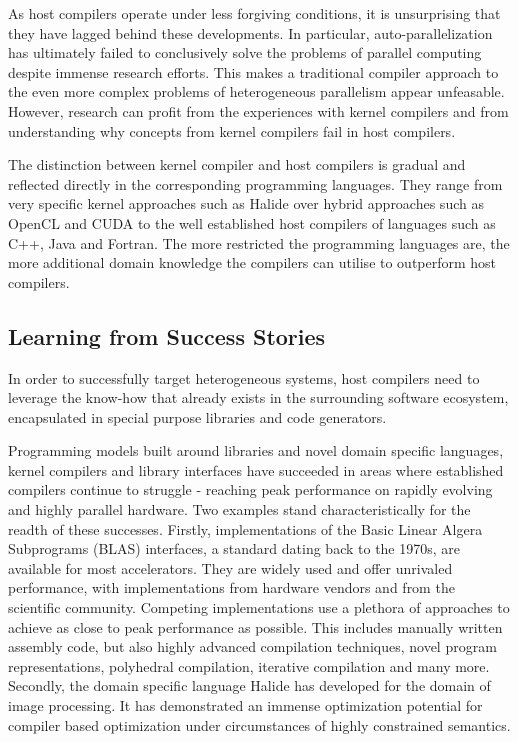     As host compilers operate under less forgiving conditions, it is
    unsurprising that they have lagged behind these developments.
    In particular, auto-parallelization has ultimately failed to conclusively
    solve the problems of parallel computing despite immense research efforts.
    This makes a traditional compiler approach to the even more complex
    problems of heterogeneous parallelism appear unfeasable.
    However, research can profit from the experiences with kernel compilers
    and from understanding why concepts from kernel compilers fail in
    host compilers.

    The distinction between kernel compiler and host compilers is gradual and
    reflected directly in the corresponding programming languages.
    They range from very specific kernel approaches such as Halide over hybrid
    approaches such as OpenCL and CUDA to the well established host compilers of
    languages such as C++, Java and Fortran.
    The more restricted the programming languages are, the more additional
    domain knowledge the compilers can utilise to outperform host compilers.


    \subsection*{Learning from Success Stories}

    In order to successfully target heterogeneous systems, host compilers need
    to leverage the know-how that already exists in the surrounding software
    ecosystem, encapsulated in special purpose libraries and code generators.

    Programming models built around libraries and novel domain specific
    languages, kernel compilers and library interfaces have succeeded in areas
    where established compilers continue to struggle - reaching peak performance
    on rapidly evolving and highly parallel hardware.
    Two examples stand characteristically for the readth of these successes.
    Firstly, implementations of the Basic Linear Algera Subprograms (BLAS)
    interfaces, a standard dating back to the 1970s, are available for most
    accelerators.
    They are widely used and offer unrivaled performance, with implementations
    from hardware vendors and from the scientific community.
    Competing implementations use a plethora of approaches to achieve as close
    to peak performance as possible.
    This includes manually written assembly code, but also highly advanced
    compilation techniques, novel program representations, polyhedral
    compilation, iterative compilation and many more.
    Secondly, the domain specific language Halide has developed for the domain
    of image processing.
    It has demonstrated an immense optimization potential for compiler based
    optimization under circumstances of highly constrained semantics.

